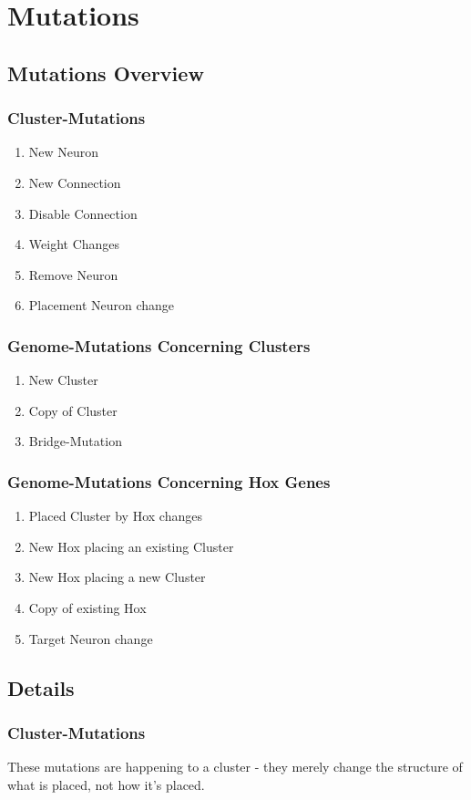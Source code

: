 \newpage
\section{Mutations}

\subsection{Mutations Overview}

\subsubsection{Cluster-Mutations}
\begin{enumerate}\itemsep0pt
	\item New Neuron
	\item New Connection
	\item Disable Connection
	\item Weight Changes
	\item Remove Neuron
	\item Placement Neuron change
\end{enumerate}

\subsubsection{Genome-Mutations Concerning Clusters}
\begin{enumerate}\itemsep0pt
	\item New Cluster
	\item Copy of Cluster
	\item Bridge-Mutation
\end{enumerate}

\subsubsection{Genome-Mutations Concerning Hox Genes}
\begin{enumerate}\itemsep0pt
	\item Placed Cluster by Hox changes
	\item New Hox placing an existing Cluster
	\item New Hox placing a new Cluster
	\item Copy of existing Hox
	\item Target Neuron change
\end{enumerate}

\subsection{Details}

\subsubsection{Cluster-Mutations}

These mutations are happening to a cluster - they merely change the structure of what is placed, not how it's placed.

